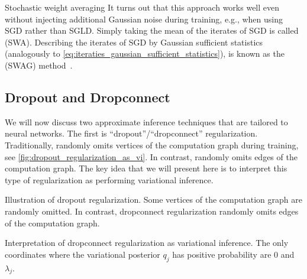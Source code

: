 \begin{rmk}{Stochastic weight averaging}{}
  It turns out that this approach works well even without injecting additional Gaussian noise during training, e.g., when using SGD rather than SGLD.
  Simply taking the mean of the iterates of SGD is called  (SWA).
  Describing the iterates of SGD by Gaussian sufficient statistics (analogously to \cref{eq:iteraties_gaussian_sufficient_statistics}), is known as the  (SWAG) method~\citep{izmailov2018averaging}.
\end{rmk}

\subsection{Dropout and Dropconnect}\label{sec:bnn:approximate_inference:dropout}

We will now discuss two approximate inference techniques that are tailored to neural networks.
The first is ``dropout''/``dropconnect'' regularization.
Traditionally,  \citep{hinton2012improving,srivastava2014dropout} randomly omits vertices of the computation graph during training, see \cref{fig:dropout_regularization_as_vi}.
In contrast,  \citep{wan2013regularization} randomly omits edges of the computation graph.
The key idea that we will present here is to interpret this type of regularization as performing variational inference.

\begin{marginfigure}[-8\baselineskip]
  \caption{Illustration of dropout regularization. Some vertices of the computation graph are randomly omitted. In contrast, dropconnect regularization randomly omits edges of the computation graph.}\label{fig:dropout_regularization}
\end{marginfigure}
\begin{marginfigure}
  \caption{Interpretation of dropconnect regularization as variational inference.
  The only coordinates where the variational posterior $q_j$ has positive probability are $0$ and $\lambda_j$.}\label{fig:dropout_regularization_as_vi}
\end{marginfigure}

